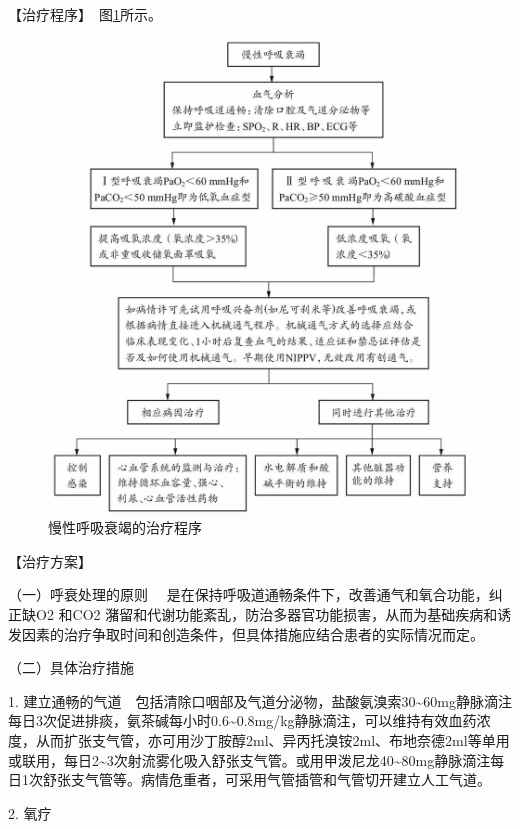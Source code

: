 【治疗程序】　图\ref{fig1-17-3}所示。

\begin{figure}[!htbp]
 \centering
 \includegraphics{./images/Image00042.jpg}
 \captionsetup{justification=centering}
 \caption{慢性呼吸衰竭的治疗程序}
 \label{fig1-17-3}
  \end{figure} 

【治疗方案】

{（一）呼衰处理的原则}
　是在保持呼吸道通畅条件下，改善通气和氧合功能，纠正缺O{2} 和CO{2}
潴留和代谢功能紊乱，防治多器官功能损害，从而为基础疾病和诱发因素的治疗争取时间和创造条件，但具体措施应结合患者的实际情况而定。

{（二）具体治疗措施}

1.
建立通畅的气道　包括清除口咽部及气道分泌物，盐酸氨溴索30\textasciitilde{}60mg静脉滴注每日3次促进排痰，氨茶碱每小时0.6\textasciitilde{}0.8mg/kg静脉滴注，可以维持有效血药浓度，从而扩张支气管，亦可用沙丁胺醇2ml、异丙托溴铵2ml、布地奈德2ml等单用或联用，每日2\textasciitilde{}3次射流雾化吸入舒张支气管。或用甲泼尼龙40\textasciitilde{}80mg静脉滴注每日1次舒张支气管等。病情危重者，可采用气管插管和气管切开建立人工气道。

2. 氧疗

